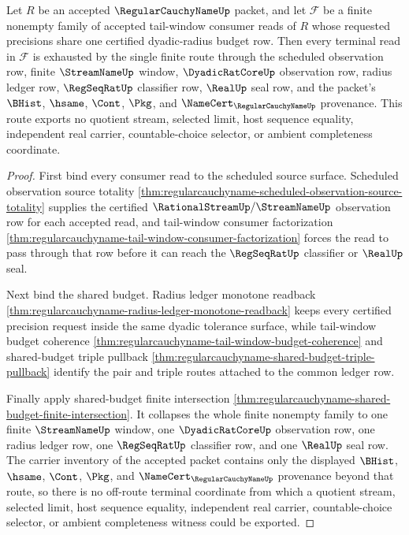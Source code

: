 \begin{theorem}
\label{thm:regularcauchyname-tail-window-budget-route-exhaustion}
Let $R$ be an accepted $\RegularCauchyNameUp$ packet, and let $\mathcal{F}$ be a finite nonempty family of accepted tail-window consumer reads of $R$ whose requested precisions share one certified dyadic-radius budget row. Then every terminal read in $\mathcal{F}$ is exhausted by the single finite route through the scheduled observation row, finite $\StreamNameUp$ window, $\DyadicRatCoreUp$ observation row, radius ledger row, $\RegSeqRatUp$ classifier row, $\RealUp$ seal row, and the packet's $\BHist$, $\hsame$, $\Cont$, $\Pkg$, and $\NameCert_{\RegularCauchyNameUp}$ provenance. This route exports no quotient stream, selected limit, host sequence equality, independent real carrier, countable-choice selector, or ambient completeness coordinate.
\end{theorem}
\begin{proof}
First bind every consumer read to the scheduled source surface. Scheduled observation source totality \autoref{thm:regularcauchyname-scheduled-observation-source-totality} supplies the certified $\RationalStreamUp/\StreamNameUp$ observation row for each accepted read, and tail-window consumer factorization \autoref{thm:regularcauchyname-tail-window-consumer-factorization} forces the read to pass through that row before it can reach the $\RegSeqRatUp$ classifier or $\RealUp$ seal.

Next bind the shared budget. Radius ledger monotone readback \autoref{thm:regularcauchyname-radius-ledger-monotone-readback} keeps every certified precision request inside the same dyadic tolerance surface, while tail-window budget coherence \autoref{thm:regularcauchyname-tail-window-budget-coherence} and shared-budget triple pullback \autoref{thm:regularcauchyname-shared-budget-triple-pullback} identify the pair and triple routes attached to the common ledger row.

Finally apply shared-budget finite intersection \autoref{thm:regularcauchyname-shared-budget-finite-intersection}. It collapses the whole finite nonempty family to one finite $\StreamNameUp$ window, one $\DyadicRatCoreUp$ observation row, one radius ledger row, one $\RegSeqRatUp$ classifier row, and one $\RealUp$ seal row. The carrier inventory of the accepted packet contains only the displayed $\BHist$, $\hsame$, $\Cont$, $\Pkg$, and $\NameCert_{\RegularCauchyNameUp}$ provenance beyond that route, so there is no off-route terminal coordinate from which a quotient stream, selected limit, host sequence equality, independent real carrier, countable-choice selector, or ambient completeness witness could be exported.
\end{proof}

